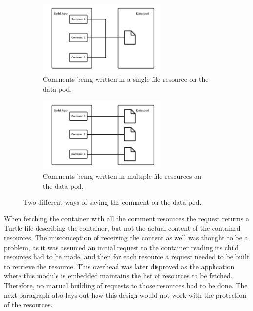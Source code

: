 \begin{figure}
    \centering
    \begin{subfigure}{.5\textwidth}
      \centering
      \includegraphics[width=0.7\textwidth]{prototype/graphs/poc-comment-single-resource-comments.png}
      \caption{Comments being written in a single file resource on the data pod.}
      \label{fig:ppc-comment-single-resource-comments}
    \end{subfigure}%
    \begin{subfigure}{.5\textwidth}
      \centering
      \includegraphics[width=0.7\textwidth]{prototype/graphs/poc-comment-multiple-resources-comments.png}
      \caption{Comments being written in multiple file resources on the data pod.}
      \label{fig:poc-comment-multiple-resources-comments}
    \end{subfigure}
    \caption{Two different ways of saving the comment on the data pod.}
    \label{fig:save-resource}
\end{figure}

When fetching the container with all the comment resources the request returns a Turtle file describing the container, but not the actual content of the contained resources. The misconception of receiving the content as well was thought to be a problem, as it was assumed an initial request to the container reading its child resources had to be made, and then for each resource a request needed to be built to retrieve the resource. This overhead was later disproved as the application where this module is embedded maintains the list of resources to be fetched. Therefore, no manual building of requests to those resources had to be done. The next paragraph also lays out how this design would not work with the protection of the resources.


